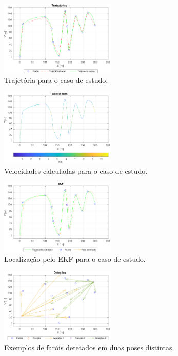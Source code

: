 \documentclass[twocolumn]{article}
\begin{document}
\begin{figure}[ht]
    \centering
    \includegraphics[width=0.49\textwidth]{figs/trajectories.pdf}
    \caption{Trajetória para o caso de estudo.}
    \label{fig:planning_trajectory}
\end{figure}

\begin{figure}[ht]
    \centering
    \includegraphics[width=0.49\textwidth]{figs/velocities.pdf}
     \caption{Velocidades calculadas para o caso de estudo.}
     \label{fig:planning_velocities}
\end{figure}

\begin{figure}[ht]
    \centering
    \includegraphics[width=0.49\textwidth]{figs/ekf.pdf}
    \caption{Localização pelo EKF para o caso de estudo.}
    \label{fig:planning_ekf}
\end{figure}

\begin{figure}[ht]
    \centering
    \includegraphics[width=0.49\textwidth]{figs/detections.pdf}
    \caption{Exemplos de faróis detetados em duas poses distintas.}
    \label{fig:planning_detections}
\end{figure}
\end{document}
